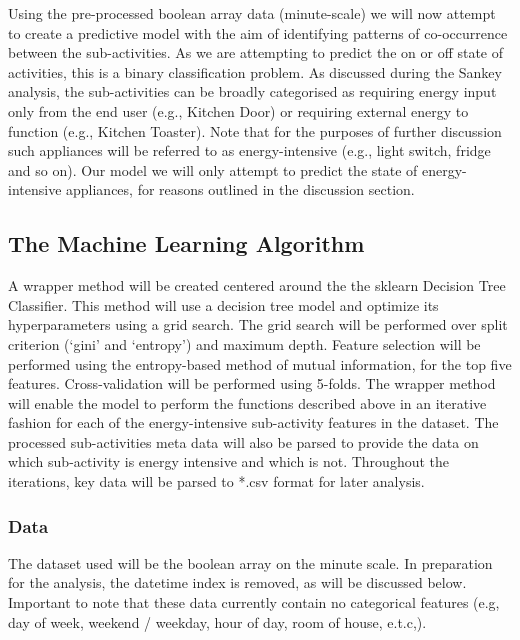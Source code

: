 \documentclass[11pt,]{article}
\begin{document}
Using the pre-processed boolean array data (minute-scale) we will now
attempt to create a predictive model with the aim of identifying
patterns of co-occurrence between the sub-activities. As we are
attempting to predict the on or off state of activities, this is a
binary classification problem. As discussed during the Sankey analysis,
the sub-activities can be broadly categorised as requiring energy input
only from the end user (e.g., Kitchen Door) or requiring external energy
to function (e.g., Kitchen Toaster). Note that for the purposes of
further discussion such appliances will be referred to as
energy-intensive (e.g., light switch, fridge and so on). Our model we
will only attempt to predict the state of energy-intensive appliances,
for reasons outlined in the discussion section.

\hypertarget{the-machine-learning-algorithm}{%
\subsection{The Machine Learning
Algorithm}\label{the-machine-learning-algorithm}}

A wrapper method will be created centered around the the sklearn
Decision Tree Classifier. This method will use a decision tree model and
optimize its hyperparameters using a grid search. The grid search will
be performed over split criterion (`gini' and `entropy') and maximum
depth. Feature selection will be performed using the entropy-based
method of mutual information, for the top five features.
Cross-validation will be performed using 5-folds. The wrapper method
will enable the model to perform the functions described above in an
iterative fashion for each of the energy-intensive sub-activity features
in the dataset. The processed sub-activities meta data will also be
parsed to provide the data on which sub-activity is energy intensive and
which is not. Throughout the iterations, key data will be parsed to
*.csv format for later analysis.

\hypertarget{data}{%
\subsubsection{Data}\label{data}}

The dataset used will be the boolean array on the minute scale. In
preparation for the analysis, the datetime index is removed, as will be
discussed below. Important to note that these data currently contain no
categorical features (e.g, day of week, weekend / weekday, hour of day,
room of house, e.t.c,).
\end{document}
